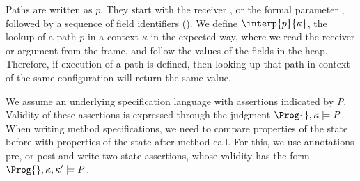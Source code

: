  
Paths are written as $p$. They %
start with the receiver \this, or the formal parameter \x, followed by
a %
sequence of field identifiers (). We define
$\interp{p}{\kappa}$, the lookup of a path $p$ in a context $\kappa$ in the expected way,
where we read the receiver or argument from the frame, and follow the
values of the fields in the heap.
 Therefore, if  execution of a path is defined, then looking up that
 path in context of the same configuration will return the same value.


 \renewcommand{\code}{{\prg{code}}}

We assume an underlying specification language with assertions indicated by  {\it P}. Validity of these assertions is expressed through the judgment  $\Prog{},\kappa \models {\it P}$.  When writing method specifications, we need to compare properties of the state before with properties of the state after method call.  For this, we use annotations \textsf{pre}, or \textsf{post} and write two-state assertions, whose validity has the form    $\Prog{},\kappa, \kappa' \models {\it P}$.  


  


